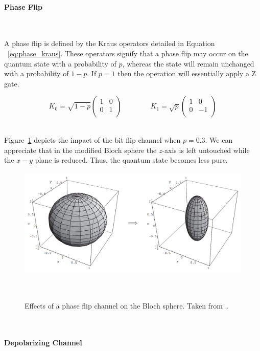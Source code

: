 \paragraph{Phase Flip} \

A phase flip is defined by the Kraus operators detailed in Equation
~\ref{eq:phase_kraus}. These operators signify that a phase flip
may occur on the quantum state with a probability of \(p\), whereas
the state will remain unchanged with a probability of \(1-p\). If
\(p=1\) then the operation will essentially apply a Z gate. \

\begin{equation}\label{eq:phase_kraus}
  K_0 = \sqrt{1-p} \begin{pmatrix}
          1 & 0 \\
          0 & 1 \\
        \end{pmatrix} \qquad \qquad
  K_1 = \sqrt{p} \begin{pmatrix}
          1 & 0 \\
          0 & -1 \\
        \end{pmatrix}
\end{equation} \

Figure~\ref{fig:phase_flip} depicts the impact of the bit flip
channel when \(p=0.3\). We can appreciate that in the modified
Bloch sphere the \(z\)-axis is left untouched while the \(x-y\)
plane is reduced. Thus, the quantum state becomes less pure. \

\begin{figure}[h!]
  \includegraphics[scale=0.39]{figures/phase_flip.png}
  \centering
  \caption{Effects of a phase flip channel on the Bloch sphere. Taken from~\cite{nielsen_quantum_2010}.}
~\label{fig:phase_flip}
\end{figure} \

\paragraph{Depolarizing Channel} \

